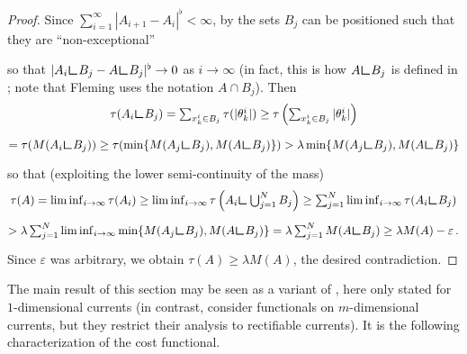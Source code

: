\documentclass[10pt,a4paper,oneside,final]{article}
\newcommand{\restr}{{\mbox{\LARGE$\llcorner$}}}
\newcommand{\mass}[1]{M(#1)}
\newcommand{\flatNorm}[1]{|#1|^\flat}
\numberwithin{equation}{section}
\theoremstyle{plain}
\theoremstyle{definition}
\theoremstyle{remark}
\newcommand{\notinclude}[1]{}
\begin{document}
\begin{proof}
Since $\sum_{i=1}^\infty\flatNorm{A_{i+1}-A_i}<\infty$, by \cite[Lem.\,(2.1) \& Sec.\,4]{Fl66} the sets $B_j$ can be positioned such that they are ``non-exceptional''
\notinclude{(note that the grid of hypercubes can be shifted in any direction by any real number without violating the condition;
if not, then just repeat the grid refinement process, where the grid is shifted by half a side length)}
so that $\flatNorm{A_i\restr B_j-A\restr B_j}\to0$ as $i\to\infty$ (in fact, this is how $A\restr B_j$ is defined in \cite[Sec.\,4]{Fl66}; note that Fleming uses the notation $A\cap B_j$).
Then
\begin{multline*}
\textstyle
\tau(A_i\restr B_j)
=\sum_{x_k^i\in B_j}\tau(|\theta_k^i|)
\geq\tau\left(\sum_{x_k^i\in B_j}|\theta_k^i|\right)\\
=\tau(\mass{A_i\restr B_j})
\geq\tau(\min\{\mass{A_j\restr B_j},\mass{A\restr B_j}\})
>\lambda\min\{\mass{A_j\restr B_j},\mass{A\restr B_j}\}
\end{multline*}
so that (exploiting the lower semi-continuity of the mass)
\begin{multline*}
\textstyle
\tau(A)
=\liminf_{i\to\infty}\tau(A_i)
\geq\liminf_{i\to\infty}\tau\left(A_i\restr\bigcup_{j=1}^N B_j\right)
\geq\sum_{j=1}^N\liminf_{i\to\infty}\tau(A_i\restr B_j)\\
\textstyle
>\lambda\sum_{j=1}^N\liminf_{i\to\infty}\min\{\mass{A_j\restr B_j},\mass{A\restr B_j}\}
=\lambda\sum_{j=1}^N\mass{A\restr B_j}
\geq\lambda\mass{A}-\varepsilon\,.
\end{multline*}
Since $\varepsilon$ was arbitrary, we obtain $\tau(A)\geq\lambda\mass{A}$, the desired contradiction.
\end{proof}


The main result of this section may be seen as a variant of \cite{CoRoMa17}, here only stated for $1$-dimensional currents
(in contrast, \cite{CoRoMa17} consider functionals on $m$-dimensional currents, but they restrict their analysis to rectifiable currents).
It is the following characterization of the cost functional.
\end{document}
